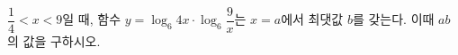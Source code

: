 $\dfrac{1}{4}<x<9$일 때, 함수 $y=\log_6 4x\cdot\log_6 \dfrac{9}{x}$는 $x=a$에서 최댓값 $b$를 갖는다. 이때 $ab$의 값을 구하시오.
